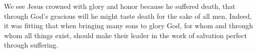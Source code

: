 \lettrine[lines=3]{W}{}e see Jesus crowned with glory and honor because he suffered death, that through God’s gracious will he might taste death for the sake of all men. Indeed, it was fitting that when bringing many sons to glory God, for whom and through whom all things exist, should make their leader in the work of salvation perfect through suffering.